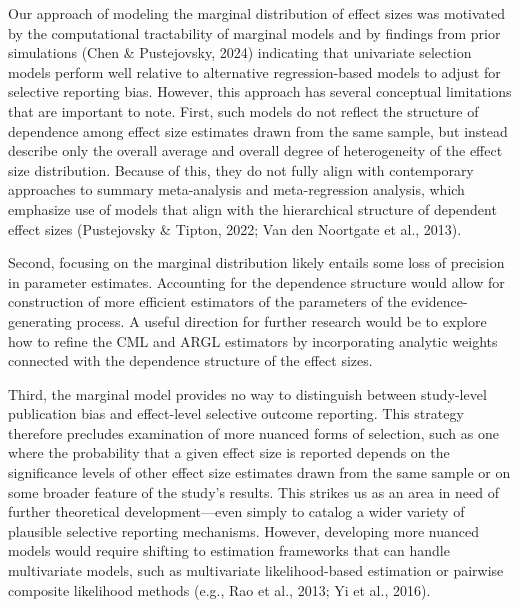 \documentclass[
  american,
  man, donotrepeattitle,floatsintext]{apa7}
\begin{document}
Our approach of modeling the marginal distribution of effect sizes was motivated by the computational tractability of marginal models and by findings from prior simulations (Chen \& Pustejovsky, 2024) indicating that univariate selection models perform well relative to alternative regression-based models to adjust for selective reporting bias.
However, this approach has several conceptual limitations that are important to note.
First, such models do not reflect the structure of dependence among effect size estimates drawn from the same sample, but instead describe only the overall average and overall degree of heterogeneity of the effect size distribution.
Because of this, they do not fully align with contemporary approaches to summary meta-analysis and meta-regression analysis, which emphasize use of models that align with the hierarchical structure of dependent effect sizes (Pustejovsky \& Tipton, 2022; Van den Noortgate et al., 2013).

Second, focusing on the marginal distribution likely entails some loss of precision in parameter estimates.
Accounting for the dependence structure would allow for construction of more efficient estimators of the parameters of the evidence-generating process.
A useful direction for further research would be to explore how to refine the CML and ARGL estimators by incorporating analytic weights connected with the dependence structure of the effect sizes.

Third, the marginal model provides no way to distinguish between study-level publication bias and effect-level selective outcome reporting.
This strategy therefore precludes examination of more nuanced forms of selection, such as one where the probability that a given effect size is reported depends on the significance levels of other effect size estimates drawn from the same sample or on some broader feature of the study's results.
This strikes us as an area in need of further theoretical development---even simply to catalog a wider variety of plausible selective reporting mechanisms.
However, developing more nuanced models would require shifting to estimation frameworks that can handle multivariate models, such as multivariate likelihood-based estimation or pairwise composite likelihood methods (e.g., Rao et al., 2013; Yi et al., 2016).
\end{document}
